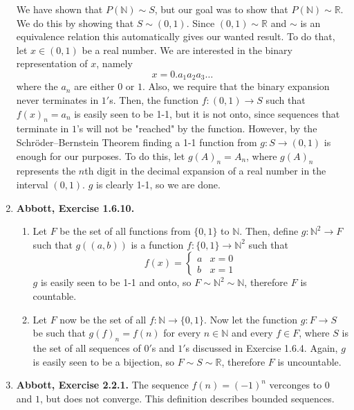 \documentclass{article}
\newcommand{\N}{\mathbb{N}}
\newcommand{\R}{\mathbb{R}}
\newcommand{\exc}[2][Abbott]{\item \textbf{#1, Exercise #2.}}
\begin{document}
\begin{enumerate}
	We have shown that $P(\N) \sim S$, but our goal was to show that $P(\N) \sim \R$. We do this by showing that $S \sim (0, 1)$. Since $(0, 1) \sim \R$ and $\sim$ is an equivalence relation this automatically gives our wanted result. To do that, let $x \in (0, 1)$ be a real number. We are interested in the binary representation of $x$, namely \begin{equation*}
	x = 0.a_1 a_2 a_3 \dots
	\end{equation*}
	where the $a_n$ are either $0$ or $1$. Also, we require that the binary expansion never terminates in $1'$s. Then, the function $f : (0, 1) \rightarrow S$ such that $f(x)_n = a_n$ is easily seen to be 1-1, but it is not onto, since sequences that terminate in $1$'s will not be "reached" by the function. However, by the Schröder–Bernstein Theorem finding a 1-1 function from $g : S \rightarrow (0, 1)$ is enough for our purposes. To do this, let $g(A)_n = A_n$, where $g(A)_n$ represents the $n$th digit in the decimal expansion of a real number in the interval $(0, 1)$. $g$ is clearly 1-1, so we are done.
					    
	\exc{1.6.10}
				      	          
	\begin{enumerate}
		\item Let $F$ be the set of all functions from $\{0, 1\}$ to $\N$. Then, define $g : \N^2 \rightarrow F$ such that $g((a, b))$ is a function $f : \{0, 1\} \rightarrow \N^2$ such that \begin{equation*}
		      f(x) = \begin{cases}
		      a & x = 0 \\
		      b & x = 1
		\end{cases}
		\end{equation*}
		$g$ is easily seen to be 1-1 and onto, so $F \sim \N^2 \sim \N$, therefore $F$ is countable.
							      		      	        
		\item Let $F$ now be the set of all $f : \N \rightarrow \{0, 1\}$. Now let the function $g : F \rightarrow S$ be such that $g(f)_n = f(n)$ for every $n \in \N$ and every $f \in F$, where $S$ is the set of all sequences of $0'$s and $1'$s discussed in Exercise 1.6.4. Again, $g$ is easily seen to be a bijection, so $F \sim S \sim \R$, therefore $F$ is uncountable.
	\end{enumerate}
				      	          
	\exc{2.2.1}
	The sequence $f(n) = (-1)^n$ verconges to $0$ and $1$, but does not converge. This definition describes bounded sequences.
				      	          

\end{enumerate}
\end{document}
